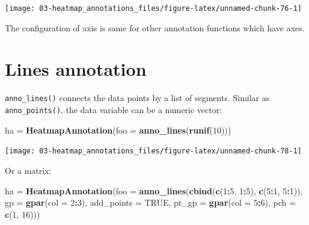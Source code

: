\documentclass[]{book}
\newenvironment{Shaded}{\begin{snugshade}}{\end{snugshade}}
\newcommand{\KeywordTok}[1]{\textcolor[rgb]{0.13,0.29,0.53}{\textbf{#1}}}
\newcommand{\DataTypeTok}[1]{\textcolor[rgb]{0.13,0.29,0.53}{#1}}
\newcommand{\DecValTok}[1]{\textcolor[rgb]{0.00,0.00,0.81}{#1}}
\newcommand{\StringTok}[1]{\textcolor[rgb]{0.31,0.60,0.02}{#1}}
\newcommand{\OtherTok}[1]{\textcolor[rgb]{0.56,0.35,0.01}{#1}}
\newcommand{\OperatorTok}[1]{\textcolor[rgb]{0.81,0.36,0.00}{\textbf{#1}}}
\newcommand{\NormalTok}[1]{#1}
\theoremstyle{definition}
\theoremstyle{definition}
\theoremstyle{definition}
\theoremstyle{remark}
\begin{document}
\begin{center}\texttt{[image: 03-heatmap\_annotations\_files/figure-latex/unnamed-chunk-76-1]} \end{center}

The configuration of axis is same for other annotation functions which
have axes.

\section{Lines annotation}\label{lines-annotation}

\texttt{anno\_lines()} connects the data points by a list of segments.
Similar as \texttt{anno\_points()}, the data variable can be a numeric
vector:

\begin{Shaded}
\begin{Highlighting}[]
\NormalTok{ha =}\StringTok{ }\KeywordTok{HeatmapAnnotation}\NormalTok{(}\DataTypeTok{foo =} \KeywordTok{anno_lines}\NormalTok{(}\KeywordTok{runif}\NormalTok{(}\DecValTok{10}\NormalTok{)))}
\end{Highlighting}
\end{Shaded}

\begin{center}\texttt{[image: 03-heatmap\_annotations\_files/figure-latex/unnamed-chunk-78-1]} \end{center}

Or a matrix:

\begin{Shaded}
\begin{Highlighting}[]
\NormalTok{ha =}\StringTok{ }\KeywordTok{HeatmapAnnotation}\NormalTok{(}\DataTypeTok{foo =} \KeywordTok{anno_lines}\NormalTok{(}\KeywordTok{cbind}\NormalTok{(}\KeywordTok{c}\NormalTok{(}\DecValTok{1}\OperatorTok{:}\DecValTok{5}\NormalTok{, }\DecValTok{1}\OperatorTok{:}\DecValTok{5}\NormalTok{), }\KeywordTok{c}\NormalTok{(}\DecValTok{5}\OperatorTok{:}\DecValTok{1}\NormalTok{, }\DecValTok{5}\OperatorTok{:}\DecValTok{1}\NormalTok{)), }
    \DataTypeTok{gp =} \KeywordTok{gpar}\NormalTok{(}\DataTypeTok{col =} \DecValTok{2}\OperatorTok{:}\DecValTok{3}\NormalTok{), }\DataTypeTok{add_points =} \OtherTok{TRUE}\NormalTok{, }\DataTypeTok{pt_gp =} \KeywordTok{gpar}\NormalTok{(}\DataTypeTok{col =} \DecValTok{5}\OperatorTok{:}\DecValTok{6}\NormalTok{), }\DataTypeTok{pch =} \KeywordTok{c}\NormalTok{(}\DecValTok{1}\NormalTok{, }\DecValTok{16}\NormalTok{)))}
\end{Highlighting}
\end{Shaded}
\end{document}

